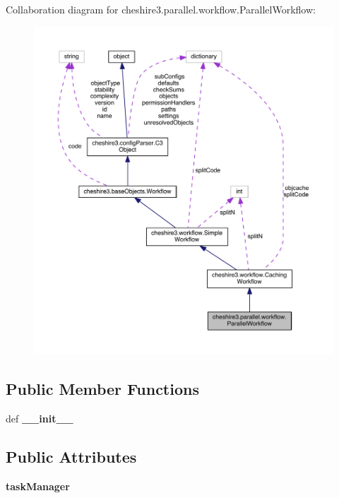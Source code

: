 Collaboration diagram for cheshire3.\-parallel.\-workflow.\-Parallel\-Workflow\-:
\nopagebreak
\begin{figure}[H]
\begin{center}
\leavevmode
\includegraphics[width=350pt]{classcheshire3_1_1parallel_1_1workflow_1_1_parallel_workflow__coll__graph}
\end{center}
\end{figure}
\subsection*{Public Member Functions}
\begin{DoxyCompactItemize}
\item 
\hypertarget{classcheshire3_1_1parallel_1_1workflow_1_1_parallel_workflow_a1fc2c88bc6c5a655fee5afc64a55c373}{def {\bfseries \-\_\-\-\_\-init\-\_\-\-\_\-}}\label{classcheshire3_1_1parallel_1_1workflow_1_1_parallel_workflow_a1fc2c88bc6c5a655fee5afc64a55c373}

\end{DoxyCompactItemize}
\subsection*{Public Attributes}
\begin{DoxyCompactItemize}
\item 
\hypertarget{classcheshire3_1_1parallel_1_1workflow_1_1_parallel_workflow_ab5ccefa372d02b24792f7f1c1cc81c39}{{\bfseries task\-Manager}}\label{classcheshire3_1_1parallel_1_1workflow_1_1_parallel_workflow_ab5ccefa372d02b24792f7f1c1cc81c39}

\end{DoxyCompactItemize}
